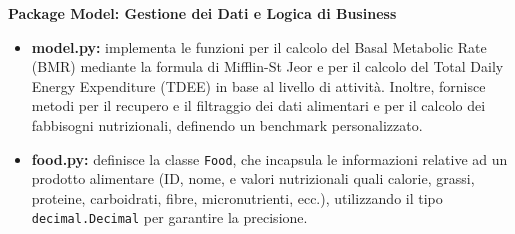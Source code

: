 \documentclass[11pt,a4paper]{article}
\begin{document}
\textbf{Package Model: Gestione dei Dati e Logica di Business} \\
\begin{itemize}
    \item \textbf{model.py:} implementa le funzioni per il calcolo del Basal Metabolic Rate (BMR) mediante la formula di Mifflin-St Jeor e per il calcolo del Total Daily Energy Expenditure (TDEE) in base al livello di attività. Inoltre, fornisce metodi per il recupero e il filtraggio dei dati alimentari e per il calcolo dei fabbisogni nutrizionali, definendo un benchmark personalizzato.
    \item \textbf{food.py:} definisce la classe \texttt{Food}, che incapsula le informazioni relative ad un prodotto alimentare (ID, nome, e valori nutrizionali quali calorie, grassi, proteine, carboidrati, fibre, micronutrienti, ecc.), utilizzando il tipo \texttt{decimal.Decimal} per garantire la precisione.
\end{itemize}
\end{document}
